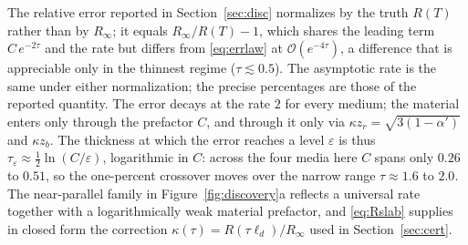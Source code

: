 \documentclass[11pt]{article}
\newcommand{\ld}{\ell_d}
\begin{document}
The relative error reported in Section~\ref{sec:disc} normalizes by the truth
$R(T)$ rather than by $R_\infty$; it equals $R_\infty/R(T)-1$, which shares the
leading term $C\,e^{-2\tau}$ and the rate but differs from \eqref{eq:errlaw} at
$\mathcal{O}(e^{-4\tau})$, a difference that is appreciable only in the thinnest
regime ($\tau\lesssim0.5$). The asymptotic rate is the same under either
normalization; the precise percentages are those of the reported quantity. The
error decays at the rate $2$ for every medium; the material enters only
through the prefactor $C$, and through it only via $\kappa z_r=\sqrt{3(1-\alpha')}$
and $\kappa z_b$. The thickness at which the error reaches a level $\varepsilon$ is
thus $\tau_\varepsilon\approx\tfrac12\ln(C/\varepsilon)$, logarithmic in $C$:
across the four media here $C$ spans only $0.26$ to $0.51$, so the one-percent
crossover moves over the narrow range $\tau\approx1.6$ to $2.0$. The
near-parallel family in Figure~\ref{fig:discovery}a reflects a
universal rate together with a logarithmically weak material
prefactor, and \eqref{eq:Rslab} supplies in closed form the correction
$\kappa(\tau)=R(\tau\ld)/R_\infty$ used in Section~\ref{sec:cert}.
\end{document}
